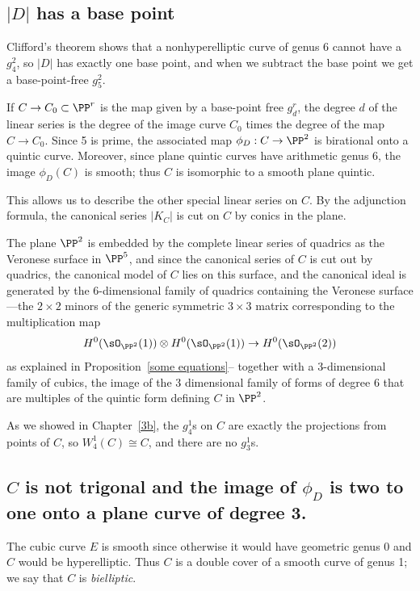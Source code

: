 \subsection{$|D|$ has a base point}\label{g26 has a base point}
Clifford's theorem shows that a nonhyperelliptic curve of genus 6 cannot have a $g^2_4$, so   
$|D|$ has exactly one base point, and when we subtract the base point we get a base-point-free $g^2_5$. 

If $C \to C_0 \subset \PP^r$ is the map given by a base-point free $g^r_d$, the degree $d$ of the linear series is the degree of the image curve $C_0$ times the degree of the map $C \to C_0$. Since 5 is prime, the associated map $\phi_D : C \to \PP^2$ is birational onto a quintic curve. Moreover, since plane quintic curves have arithmetic genus 6, the image $\phi_D(C)$ is smooth; thus $C$ is isomorphic to a smooth plane quintic.

This allows us to describe the other special linear series on $C$. By the adjunction formula, the canonical series $|K_C|$ is cut on $C$ by conics in the plane. 

The plane $\PP^2$ is embedded by the complete linear series of quadrics as the Veronese surface in $\PP^5$, and since the canonical series of $C$ is cut out by quadrics, the canonical model of $C$
lies on this surface, and the canonical ideal is generated by the 6-dimensional family of quadrics containing the Veronese surface---the $2\times 2$ minors of the generic symmetric $3\times 3$ matrix
corresponding to the multiplication map 
$$
H^{0}(\sO_{\PP^{2}}(1)) \otimes H^{0}(\sO_{\PP^{2}}(1)) \to H^{0}(\sO_{\PP^{2}}(2))
$$
as explained in Proposition~\ref{some equations}-- together with a 3-dimensional family of cubics,  the image of the 3 dimensional family of forms of degree 6 that are multiples of the quintic form defining $C$ in $\PP^2$.

As we showed in Chapter~\ref{3b}, the $g^1_4$s on $C$ are exactly the projections from points of $C$, so $W^1_4(C)\cong C$, and there are no 
$g^{1}_{3}$s.


\subsection{$C$ is not trigonal and the image of $\phi_{D}$ is two to one onto a  plane curve of degree 3.}

The cubic curve $E$ is smooth since otherwise it would have geometric genus 0 and $C$ would be  hyperelliptic. Thus $C$ is a double cover of a smooth curve of genus 1; we say that $C$ is \emph{bielliptic}.

